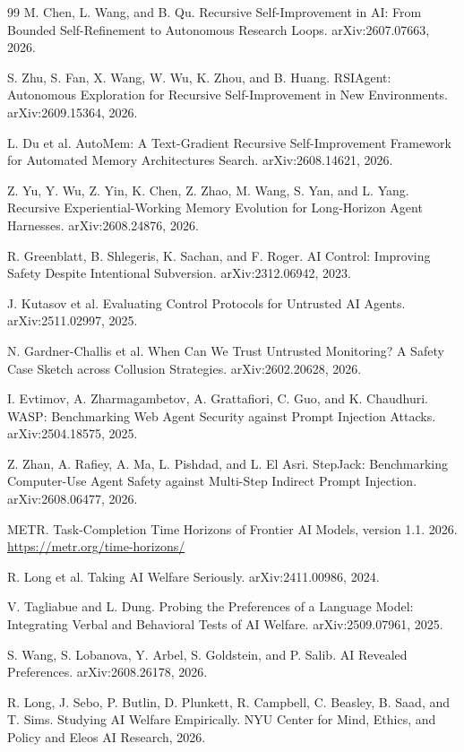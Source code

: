 \documentclass[11pt,a4paper]{article}
\begin{document}
\begin{thebibliography}{99}
M. Chen, L. Wang, and B. Qu. Recursive Self-Improvement in AI: From Bounded Self-Refinement to Autonomous Research Loops. arXiv:2607.07663, 2026.

S. Zhu, S. Fan, X. Wang, W. Wu, K. Zhou, and B. Huang. RSIAgent: Autonomous Exploration for Recursive Self-Improvement in New Environments. arXiv:2609.15364, 2026.

L. Du et al. AutoMem: A Text-Gradient Recursive Self-Improvement Framework for Automated Memory Architectures Search. arXiv:2608.14621, 2026.

Z. Yu, Y. Wu, Z. Yin, K. Chen, Z. Zhao, M. Wang, S. Yan, and L. Yang. Recursive Experiential-Working Memory Evolution for Long-Horizon Agent Harnesses. arXiv:2608.24876, 2026.

R. Greenblatt, B. Shlegeris, K. Sachan, and F. Roger. AI Control: Improving Safety Despite Intentional Subversion. arXiv:2312.06942, 2023.

J. Kutasov et al. Evaluating Control Protocols for Untrusted AI Agents. arXiv:2511.02997, 2025.

N. Gardner-Challis et al. When Can We Trust Untrusted Monitoring? A Safety Case Sketch across Collusion Strategies. arXiv:2602.20628, 2026.

I. Evtimov, A. Zharmagambetov, A. Grattafiori, C. Guo, and K. Chaudhuri. WASP: Benchmarking Web Agent Security against Prompt Injection Attacks. arXiv:2504.18575, 2025.

Z. Zhan, A. Rafiey, A. Ma, L. Pishdad, and L. El Asri. StepJack: Benchmarking Computer-Use Agent Safety against Multi-Step Indirect Prompt Injection. arXiv:2608.06477, 2026.

METR. Task-Completion Time Horizons of Frontier AI Models, version 1.1. 2026. \url{https://metr.org/time-horizons/}

R. Long et al. Taking AI Welfare Seriously. arXiv:2411.00986, 2024.

V. Tagliabue and L. Dung. Probing the Preferences of a Language Model: Integrating Verbal and Behavioral Tests of AI Welfare. arXiv:2509.07961, 2025.

S. Wang, S. Lobanova, Y. Arbel, S. Goldstein, and P. Salib. AI Revealed Preferences. arXiv:2608.26178, 2026.

R. Long, J. Sebo, P. Butlin, D. Plunkett, R. Campbell, C. Beasley, B. Saad, and T. Sims. Studying AI Welfare Empirically. NYU Center for Mind, Ethics, and Policy and Eleos AI Research, 2026.


\end{thebibliography}
\end{document}
